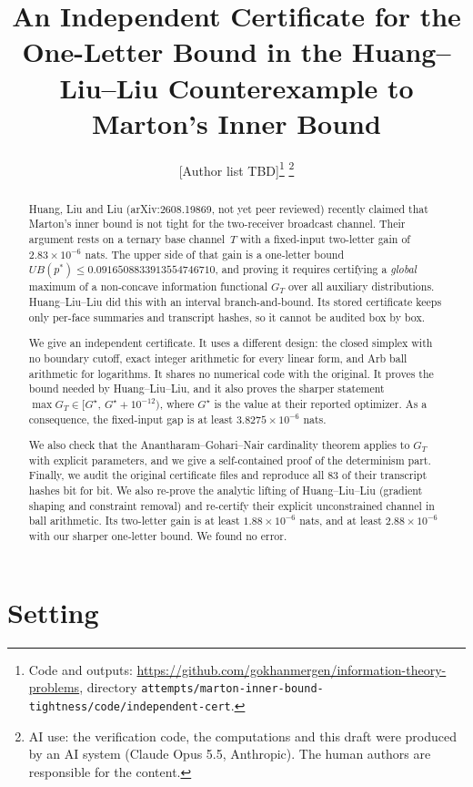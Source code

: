 \documentclass[11pt,draftclsnofoot,onecolumn,journal]{IEEEtran}
\title{An Independent Certificate for the One-Letter Bound in the
Huang--Liu--Liu Counterexample to Marton's Inner Bound}
\author{%
  [Author list TBD]\thanks{%
  Code and outputs:
  \url{https://github.com/gokhanmergen/information-theory-problems},
  directory \texttt{attempts/marton-inner-bound-tightness/code/independent-cert}.}%
\thanks{AI use: the verification code, the computations and this draft were produced by an AI
system (Claude Opus 5.5, Anthropic). The human authors are responsible for the content.}}
\begin{document}
\maketitle

\begin{abstract}
Huang, Liu and Liu (arXiv:2608.19869, not yet peer reviewed) recently claimed that Marton's
inner bound is not tight for the two-receiver broadcast channel. Their argument rests on a ternary base channel~$T$ with a
fixed-input two-letter gain of $2.83\times10^{-6}$ nats. The upper side of that gain is a
one-letter bound $UB(p^*)\le 0.0916508833913554746710$, and proving it requires certifying a
\emph{global} maximum of a non-concave information functional $G_T$ over all auxiliary
distributions. Huang--Liu--Liu did this with an interval branch-and-bound. Its stored
certificate keeps only per-face summaries and transcript hashes, so it cannot be audited
box by box.

We give an independent certificate. It uses a different design: the closed simplex with no
boundary cutoff, exact integer arithmetic for every linear form, and Arb ball arithmetic for
logarithms. It shares no numerical code with the original. It proves the bound needed by
Huang--Liu--Liu, and it also proves the sharper statement $\max G_T\in[G^\star,\,G^\star+10^{-12})$,
where $G^\star$ is the value at their reported optimizer. As a consequence, the fixed-input gap is
at least $3.8275\times10^{-6}$ nats.

We also check that the Anantharam--Gohari--Nair cardinality theorem applies to $G_T$ with explicit
parameters, and we give a self-contained proof of the determinism part. Finally, we audit the
original certificate files and reproduce all 83 of their transcript hashes bit for bit.
We also re-prove the analytic lifting of Huang--Liu--Liu (gradient shaping and constraint
removal) and re-certify their explicit unconstrained channel in ball arithmetic. Its two-letter
gain is at least $1.88\times10^{-6}$ nats, and at least $2.88\times10^{-6}$ with our sharper
one-letter bound. We found no error.
\end{abstract}

\section{Setting}
\end{document}
